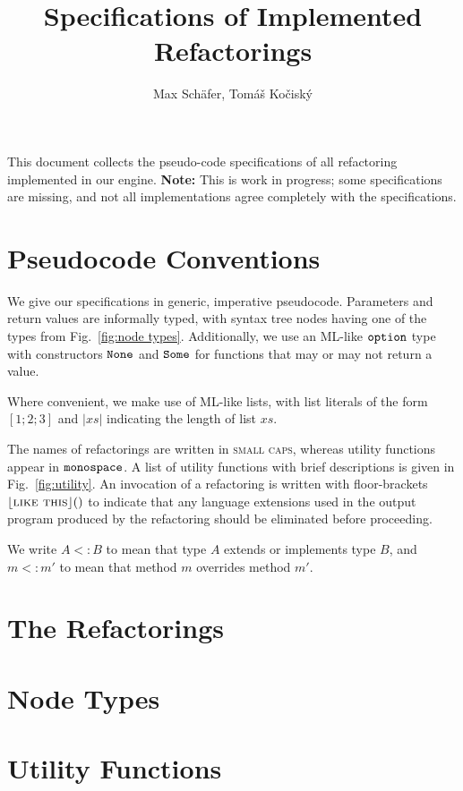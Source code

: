 \documentclass{article}
\title{Specifications of Implemented Refactorings}
\author{Max Sch\"afer, Tom\'a\v{s} Ko\v{c}isk\'y}
\newcommand{\refactoring}[1]{\textsc{#1}}
\newcommand{\refactoringNoExt}[1]{\lfloor\refactoring{#1}\rfloor}
\newcommand{\util}[1]{\ensuremath{\text{\texttt{#1}}}}
\begin{document}
\maketitle

This document collects the pseudo-code specifications of all refactoring implemented in our engine. \textbf{Note:} This is work in progress; some specifications are missing, and not all implementations agree completely with the specifications.

\section{Pseudocode Conventions}
We give our specifications in generic, imperative pseudocode. Parameters and return values are informally typed, with syntax tree nodes having one of the types from Fig.~\ref{fig:node types}. Additionally, we use an ML-like \util{option} type with constructors \util{None} and \util{Some} for functions that may or may not return a value.

Where convenient, we make use of ML-like lists, with list literals of the form $[1; 2; 3]$ and $|xs|$ indicating the length of list $xs$.

The names of refactorings are written in \refactoring{small caps}, whereas utility functions appear in \util{monospace}. A list of utility functions with brief descriptions is given in Fig.~\ref{fig:utility}. An invocation of a refactoring is written with floor-brackets $\refactoringNoExt{like this}()$ to indicate that any language extensions used in the output program produced by the refactoring should be eliminated before proceeding.

We write $A<:B$ to mean that type $A$ extends or implements type $B$, and $m<:m'$ to mean that method $m$ overrides method $m'$.

\section{The Refactorings}


























\clearpage

\section{Node Types}


\section{Utility Functions}


\clearpage

\listofalgorithms
\end{document}
